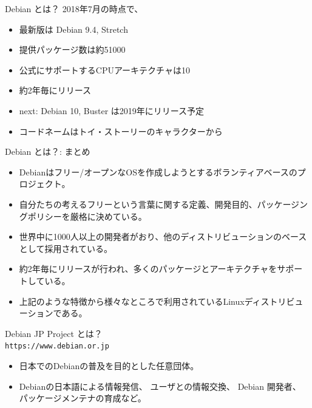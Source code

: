 \documentclass[cjk,c,squeeze,shrink,dvipdfmx,12pt]{beamer}
\begin{document}
\begin{frame}[fragile]{Debian とは？}
  2018年7月の時点で、
  \pause
  \begin{itemize}[<+->]
  \item
    最新版は {\alert{Debian 9.4}}, Stretch
  \item
    提供パッケージ数は{\alert{約51000}}
  \item
    公式にサポートするCPUアーキテクチャは{\alert{10}}
  \item {\alert{約2年毎}}にリリース
  \item next: Debian 10, Buster は2019年にリリース予定
  \item コードネームはトイ・ストーリーのキャラクターから
  \end{itemize}
\end{frame}

\begin{frame}[fragile]{Debian とは？: まとめ}
  \pause
  \begin{itemize}[<+->]
  \item Debianはフリー/オープンなOSを作成しようとするボランティアベースのプロジェクト。
  \item 自分たちの考えるフリーという言葉に関する定義、開発目的、パッケージングポリシーを厳格に決めている。
  \item 世界中に1000人以上の開発者がおり、他のディストリビューションのベースとして採用されている。
  \item 約2年毎にリリースが行われ、多くのパッケージとアーキテクチャをサポートしている。  \item 上記のような特徴から様々なところで利用されているLinuxディストリビューションである。
\end{itemize}
\end{frame}

\begin{frame}[fragile]{Debian JP Project とは？\\[-.5em]{\normalsize{\texttt{https://www.debian.or.jp}}}}
  \pause
  \begin{itemize}[<+->]
  \item 日本でのDebianの普及を目的とした任意団体。
  \item %
    Debianの日本語による情報発信、
    ユーザとの情報交換、
    Debian 開発者、
    パッケージメンテナの育成など。
  \end{itemize}
\end{frame}
\end{document}
